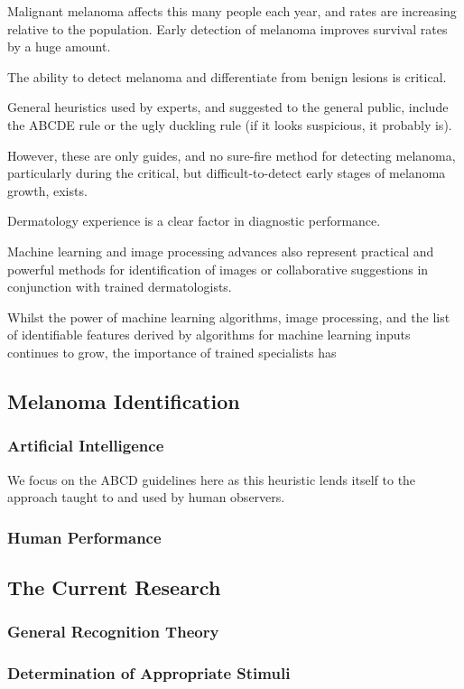 \documentclass[a4paper, natbib, doc, 12pt]{apa7}
\begin{document}
Malignant melanoma affects this many people each year, and rates are increasing relative to the population. Early detection of melanoma improves survival rates by a huge amount.

The ability to detect melanoma and differentiate from benign lesions is critical. 

General heuristics used by experts, and suggested to the general public, include the ABCDE rule or the ugly duckling rule (if it looks suspicious, it probably is). 


However, these are only guides, and no sure-fire method for detecting melanoma, particularly during the critical, but difficult-to-detect early stages of melanoma growth, exists. 

Dermatology experience is a clear factor in diagnostic performance. 

Machine learning and image processing advances also represent practical and powerful methods for identification of images or collaborative suggestions in conjunction with trained dermatologists. 

Whilst the power of machine learning algorithms, image processing, and the list of identifiable features derived by algorithms for machine learning inputs continues to grow, the importance of trained specialists has

\subsection{Melanoma Identification}
\subsubsection{Artificial Intelligence}
We focus on the ABCD guidelines here as this heuristic lends itself to the approach taught to and used by human observers. 

\subsubsection{Human Performance}
\subsection{The Current Research}
\subsubsection{General Recognition Theory}
\subsubsection{Determination of Appropriate Stimuli}
\end{document}
